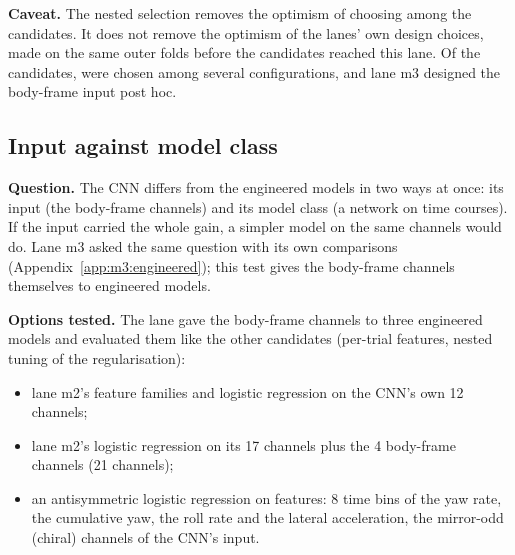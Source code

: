 \textbf{Caveat.}
The nested selection removes the optimism of choosing among the  candidates.
It does not remove the optimism of the lanes' own design choices, made on the same outer folds before the candidates reached this lane.
Of the candidates,  were chosen among several configurations, and lane m3 designed the body-frame input post hoc.


\subsection{Input against model class}\label{app:final:input}

\textbf{Question.}
The CNN differs from the engineered models in two ways at once: its input (the body-frame channels) and its model class (a network on time courses).
If the input carried the whole gain, a simpler model on the same channels would do.
Lane m3 asked the same question with its own comparisons (Appendix~\ref{app:m3:engineered}); this test gives the body-frame channels themselves to engineered models.

\textbf{Options tested.}
The lane gave the body-frame channels to three engineered models and evaluated them like the other candidates (per-trial features, nested tuning of the regularisation):
\begin{itemize}[nosep]
  \item lane m2's feature families and logistic regression on the CNN's own 12 channels;
  \item lane m2's logistic regression on its 17 channels plus the 4 body-frame channels (21 channels);
  \item an antisymmetric logistic regression on  features: 8 time bins of the yaw rate, the cumulative yaw, the roll rate and the lateral acceleration, the mirror-odd (chiral) channels of the CNN's input.
\end{itemize}

